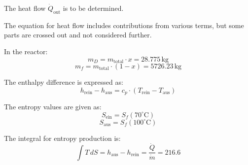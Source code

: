 The heat flow \( \dot{Q}_{\text{out}} \) is to be determined.  

The equation for heat flow includes contributions from various terms, but some parts are crossed out and not considered further.  

In the reactor:  
\[
m_D = m_{\text{total}} \cdot x = 28.775 \, \text{kg}
\]  
\[
m_f = m_{\text{total}} \cdot (1 - x) = 5726.23 \, \text{kg}
\]  

The enthalpy difference is expressed as:  
\[
h_{\text{rein}} - h_{\text{aus}} = c_{p} \cdot (T_{\text{rein}} - T_{\text{aus}})
\]  

The entropy values are given as:  
\[
S_{\text{ein}} = S_f(70^\circ\text{C})
\]  
\[
S_{\text{aus}} = S_f(100^\circ\text{C})
\]  

The integral for entropy production is:  
\[
\int T \, dS = h_{\text{aus}} - h_{\text{rein}} = \frac{\dot{Q}}{\dot{m}} = 216.6
\]